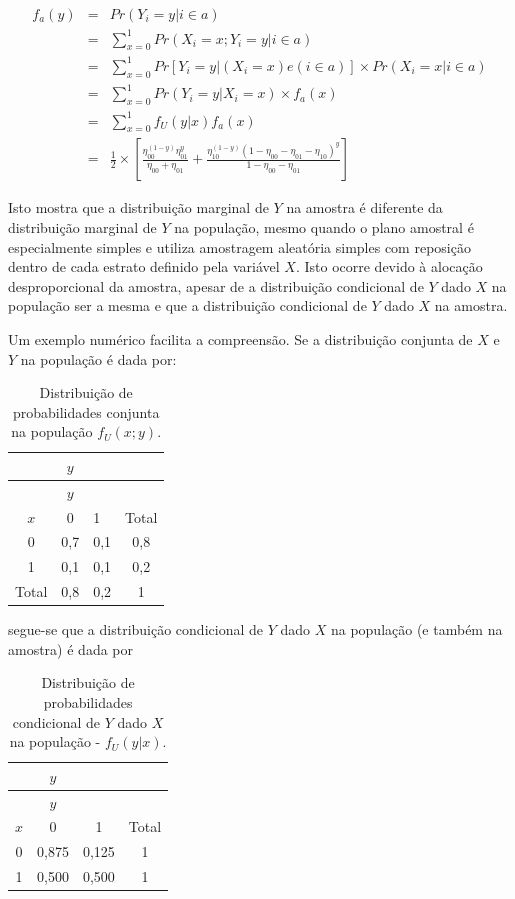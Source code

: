 \documentclass[]{book}
\theoremstyle{definition}
\theoremstyle{definition}
\theoremstyle{definition}
\theoremstyle{remark}
\begin{document}
\begin{eqnarray}
 f_a (y) &= &Pr( Y_i = y | i \in a )\\ 
&=& \sum _{x = 0} ^{1} Pr( X_i = x ; Y_i = y | i \in a) \nonumber \\ 
&=& \sum _{x = 0} ^{1} Pr[ Y_i = y | (X_i = x) e (i \in a)] \times Pr( X_i = x | i \in a) \nonumber\\ 
&=& \sum _{x = 0} ^{1} Pr( Y_i = y | X_i = x) \times f_a (x) \nonumber \\ 
&=& \sum _{x = 0} ^{1} f_U ( y | x) f_a (x) \nonumber \\ 
&=& \frac{1}{2} \times \left[ \frac{\eta_{00}^{(1-y)} \eta_{01}^y} {\eta_{00}+\eta_{01}}+ \frac{\eta_{10}^{(1-y)} (1 - \eta_{00} - \eta_{01} - \eta_{10})^y} {1 - \eta_{00} - \eta_{01}} \right]\nonumber
\end{eqnarray}

Isto mostra que a distribuição marginal de \(Y\) na amostra é diferente
da distribuição marginal de \(Y\) na população, mesmo quando o plano
amostral é especialmente simples e utiliza amostragem aleatória simples
com reposição dentro de cada estrato definido pela variável \(X\). Isto
ocorre devido à alocação desproporcional da amostra, apesar de a
distribuição condicional de \(Y\) dado \(X\) na população ser a mesma e
que a distribuição condicional de \(Y\) dado \(X\) na amostra.

Um exemplo numérico facilita a compreensão. Se a distribuição conjunta
de \(X\) e \(Y\) na população é dada por:

\begin{longtable}[]{@{}cclc@{}}
\caption{\label{tab:Tab26} Distribuição de probabilidades conjunta na
população \(f_U( x ; y )\).}\tabularnewline
\toprule
& \(y\) & &\tabularnewline
\midrule
\endfirsthead
\toprule
& \(y\) & &\tabularnewline
\midrule
\endhead
\(x\) & 0 & 1 & Total\tabularnewline
0 & 0,7 & 0,1 & 0,8\tabularnewline
1 & 0,1 & 0,1 & 0,2\tabularnewline
Total & 0,8 & 0,2 & 1\tabularnewline
\bottomrule
\end{longtable}

segue-se que a distribuição condicional de \(Y\) dado \(X\) na população
(e também na amostra) é dada por

\begin{longtable}[]{@{}cccc@{}}
\caption{\label{tab:Tab27} Distribuição de probabilidades condicional de
\(Y\) dado \(X\) na população - \(f_U( y | x )\).}\tabularnewline
\toprule
& \(y\) & &\tabularnewline
\midrule
\endfirsthead
\toprule
& \(y\) & &\tabularnewline
\midrule
\endhead
\(x\) & 0 & 1 & Total\tabularnewline
0 & 0,875 & 0,125 & 1\tabularnewline
1 & 0,500 & 0,500 & 1\tabularnewline
\bottomrule
\end{longtable}
\end{document}
